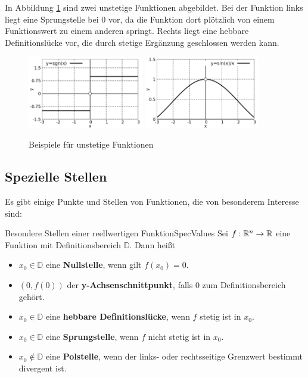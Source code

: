 In Abbildung \ref{fig:NonContFun} sind zwei unstetige Funktionen abgebildet. Bei der Funktion links liegt eine Sprungstelle bei $0$ vor, da die Funktion dort plötzlich von einem Funktionswert zu einem anderen springt. Rechts liegt eine hebbare Definitionslücke vor, die durch stetige Ergänzung geschlossen werden kann.

\begin{figure}
    \centering
    \includegraphics[width=0.45\textwidth]{./gnuplot/example-non-continous-function-1}
    \includegraphics[width=0.45\textwidth]{./gnuplot/example-non-continous-function-2}
    \caption{Beispiele für unstetige Funktionen}
    \label{fig:NonContFun}
\end{figure}

\subsection{Spezielle Stellen}

Es gibt einige Punkte und Stellen von Funktionen, die von besonderem Interesse sind:

\begin{definition}{Besondere Stellen einer reellwertigen Funktion}{SpecValues}
    Sei $f: \mathbb{R}^n\to\mathbb{R}$ eine Funktion mit Definitionsbereich $\mathbb{D}$. Dann heißt
    \begin{itemize}
        \item $x_0\in\mathbb{D}$ eine \textbf{Nullstelle}, wenn gilt $f(x_0) = 0$.
        \item $(0, f(0))$ der \textbf{y-Achsenschnittpunkt}, falls $0$ zum Definitionsbereich gehört.
        \item $x_0 \in\mathbb{D}$ eine \textbf{hebbare Definitionslücke}, wenn $f$ stetig ist in $x_0$.
        \item $x_0 \in\mathbb{D}$ eine \textbf{Sprungstelle}, wenn $f$ nicht stetig ist in $x_0$.
        \item $x_0 \notin \mathbb{D}$ eine \textbf{Polstelle}, wenn der links- oder rechtsseitige Grenzwert bestimmt divergent ist.
    \end{itemize}
\end{definition}

